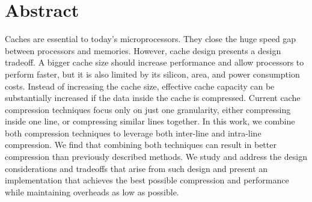 
\chapter{Abstract}
Caches are essential to today's microprocessors. They close the huge speed gap between processors and memories. However, cache design presents a design tradeoff. A bigger cache size should increase performance and allow processors to perform faster, but it is also limited by its silicon, area, and power consumption costs. Instead of increasing the cache size, effective cache capacity can be substantially increased if the data inside the cache is compressed. Current cache compression techniques focus only on just one granularity, either compressing inside one line, or compressing similar lines together. In this work, we combine both compression techniques to leverage both inter-line and intra-line compression. We find that combining both techniques can result in better compression than previously described methods. We study and address the design considerations and tradeoffs that arise from such design and present an implementation that achieves the best possible compression and performance while maintaining overheads as low as possible.

